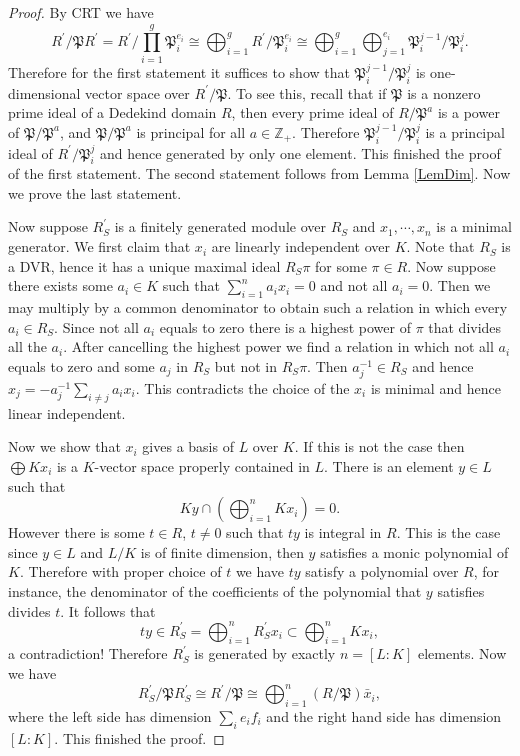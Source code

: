 \begin{proof}
By CRT we have 
$$
R^{\prime}/\mathfrak{P} R^{\prime}=R^{\prime}/\prod_{i=1}^g{\mathfrak{P} _{i}^{e_i}}\cong \bigoplus_{i=1}^g{R^{\prime}/\mathfrak{P} _{i}^{e_i}}\cong \bigoplus_{i=1}^g{\bigoplus_{j=1}^{e_i}{\mathfrak{P} _{i}^{j-1}/\mathfrak{P} _{i}^{j}}}.
$$
Therefore for the first statement it suffices to show that $\mathfrak{P}_i^{j-1}/\mathfrak{P}_i^j$ is one-dimensional vector space over $R^\prime/\mathfrak{P}$. To see this, recall that if $\mathfrak{P}$ is a nonzero prime ideal of a Dedekind domain $R$, then every prime ideal of $R/\mathfrak{P}^a$ is a power of $\mathfrak{P}/\mathfrak{P}^a$, and $\mathfrak{P}/\mathfrak{P}^a$ is principal for all $a\in\mathbb{Z}_+$. Therefore $\mathfrak{P}_i^{j-1}/\mathfrak{P}_i^j$ is a principal ideal of $R^\prime/\mathfrak{P}_i^j$ and hence generated by only one element. This finished the proof of the first statement. The second statement follows from Lemma \ref{LemDim}. Now we prove the last statement.\par
Now suppose $R_S^\prime$ is a finitely generated module over $R_S$ and $x_1,\cdots,x_n$ is a minimal generator. We first claim that $x_i$ are linearly independent over $K$. Note that $R_S$ is a DVR, hence it has a unique maximal ideal $R_S\pi$ for some $\pi\in R$. Now suppose there exists some $a_i\in K$ such that $\sum_{i=1}^na_ix_i=0$ and not all $a_i=0$. Then we may multiply by a common denominator to obtain such a relation in which every $a_i\in R_S$. Since not all $a_i$ equals to zero there is a highest power of $\pi$ that divides all the $a_i$. After cancelling the highest power we find a relation in which not all $a_i$ equals to zero and some $a_j$ in $R_S$ but not in $R_S\pi$. Then $a_j^{-1}\in R_S$ and hence $x_j=-a_j^{-1}\sum_{i\ne j}a_ix_i$. This contradicts the choice of the $x_i$ is minimal and hence linear independent.\par
Now we show that $x_i$ gives a basis of $L$ over $K$. If this is not the case then $\bigoplus Kx_i$ is a $K$-vector space properly contained in $L$. There is an element $y\in L$ such that 
$$
Ky\cap \left( \bigoplus_{i=1}^n{Kx_i} \right) =0.
$$
However there is some $t\in R$, $t\ne 0$ such that $ty$ is integral in $R$. This is the case since $y\in L$ and $L/K$ is of finite dimension, then $y$ satisfies a monic polynomial of $K$. Therefore with proper choice of $t$ we have $ty$ satisfy a polynomial over $R$, for instance, the denominator of the coefficients of the polynomial that $y$ satisfies divides $t$. It follows that 
$$
ty\in R_{S}^{\prime}=\bigoplus_{i=1}^n{R_{S}^{\prime}x_i}\subset \bigoplus_{i=1}^n{Kx_i},
$$
a contradiction! Therefore $R_S^\prime$ is generated by exactly $n=[L:K]$ elements. Now we have 
$$
R_{S}^{\prime}/\mathfrak{P} R_{S}^{\prime}\cong R^{\prime}/\mathfrak{P} \cong \bigoplus_{i=1}^n{\left( R/\mathfrak{P} \right) \bar{x}_i},
$$
where the left side has dimension $\sum_ie_if_i$ and the right hand side has dimension $[L:K]$. This finished the proof.
\end{proof}
